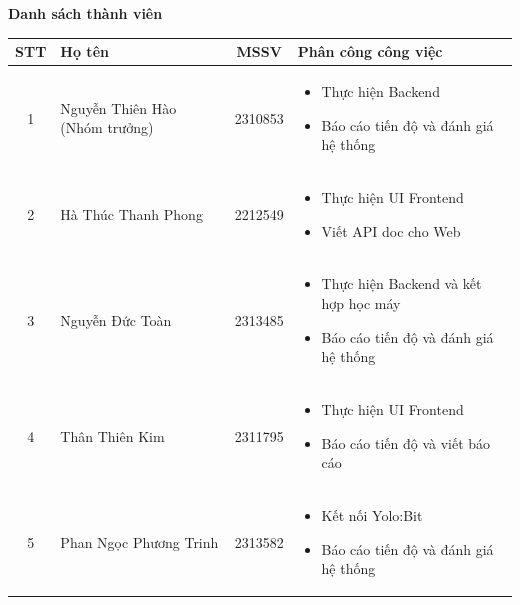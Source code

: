 \begin{center}
    {\Large \bf \color{blue} Danh sách thành viên}
\end{center}

\renewcommand{\arraystretch}{1.2}

\begin{center}
\begin{tabularx}{\textwidth}{|c|p{3.5cm}|c|X|}
\hline
\textbf{STT} & \textbf{Họ tên} & \textbf{MSSV} & \textbf{Phân công công việc} \\
\hline

1 & Nguyễn Thiên Hào
(Nhóm trưởng) & 2310853 &
\begin{itemize}
    \item  Thực hiện Backend
     \item Báo cáo tiến độ và đánh giá hệ thống
\end{itemize}

\\
\hline

2 & Hà Thúc Thanh Phong & 2212549 &
\begin{itemize}
    \item  Thực hiện UI Frontend
    \item Viết API doc cho Web
\end{itemize}
\\
\hline

3 & Nguyễn Đức Toàn	 & 2313485 &
\begin{itemize}
\item  Thực hiện Backend và kết hợp học máy
    \item Báo cáo tiến độ và đánh giá hệ thống
\end{itemize}
\\
\hline

4 & Thân Thiên Kim & 2311795 &
\begin{itemize}
    \item Thực hiện UI Frontend
    \item  Báo cáo tiến độ và viết báo cáo
\end{itemize}
\\
\hline

5 & Phan Ngọc Phương Trinh & 2313582 &
\begin{itemize}
\item Kết nối Yolo:Bit
    \item Báo cáo tiến độ và đánh giá hệ thống
    
\end{itemize}

\\
\hline

\end{tabularx}
\end{center}
